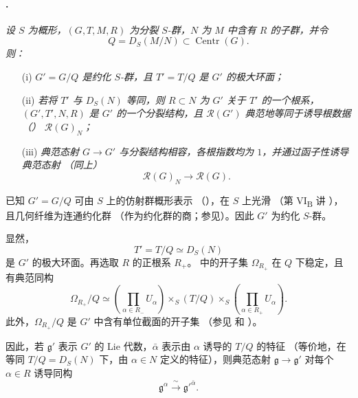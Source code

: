 \paragraph{.}
\textit{设 \(S\) 为概形，\((G,T,M,R)\) 为分裂 \(S\)-群，\(N\) 为 \(M\) 中含有 \(R\) 的子群，并令}
\[
  Q=D_S(M/N)\subset\operatorname{Centr}(G).
\]
\textit{则：}
\begin{enumerate}
\item[\textup{(i)}]
\textit{\(G'=G/Q\) 是约化 \(S\)-群，且 \(T'=T/Q\) 是 \(G'\) 的极大环面；}

\item[\textup{\SGAInlineRefTarget{sga3:xxii:prop:4.3.1:item:ii}(ii)}]
\textit{若将 \(T'\) 与 \(D_S(N)\) 等同，则 \(R\subset N\) 为 \(G'\) 关于 \(T'\) 的一个根系，\((G',T',N,R)\) 是 \(G'\) 的一个分裂结构，且 \(\mathscr R(G')\) 典范地等同于诱导根数据 \textup{（）} \(\mathscr R(G)_N\)；}

\item[\textup{(iii)}]
\textit{典范态射 \(G\to G'\) 与分裂结构相容，各根指数均为 \(1\)，并通过函子性诱导典范态射 \textup{（同上）}}
\[
  \mathscr R(G)_N\longrightarrow\mathscr R(G).
\]
\end{enumerate}

已知 \(G'=G/Q\) 可由 \(S\) 上的仿射群概形表示 \textup{（）}，在 \(S\) 上光滑 \textup{（第 VI\textsubscript{B} 讲 ）}，且几何纤维为连通约化群 \textup{（作为约化群的商；参见）}。因此 \(G'\) 为约化 \(S\)-群。

显然，
\[
  T'=T/Q\simeq D_S(N)
\]
是 \(G'\) 的极大环面。再选取 \(R\) 的正根系 \(R_+\)。 中的开子集 \(\Omega_{R_+}\) 在 \(Q\) 下稳定，且有典范同构
\[
  \Omega_{R_+}/Q
  \simeq
  \left(\prod_{\alpha\in R_-}U_\alpha\right)
  \mathop{\times}_S(T/Q)
  \mathop{\times}_S
  \left(\prod_{\alpha\in R_+}U_\alpha\right).
\]
此外，\(\Omega_{R_+}/Q\) 是 \(G'\) 中含有单位截面的开子集 \textup{（参见 和 ）}。

因此，若 \(\mathfrak g'\) 表示 \(G'\) 的 Lie 代数，\(\bar\alpha\) 表示由 \(\alpha\) 诱导的 \(T/Q\) 的特征 \textup{（等价地，在等同 \(T/Q=D_S(N)\) 下，由 \(\alpha\in N\) 定义的特征）}，则典范态射 \(\mathfrak g\to\mathfrak g'\) 对每个 \(\alpha\in R\) 诱导同构
\[
  \mathfrak g^\alpha
  \xrightarrow{\ \sim\ }
  \mathfrak g'^{\bar\alpha}.
\]

